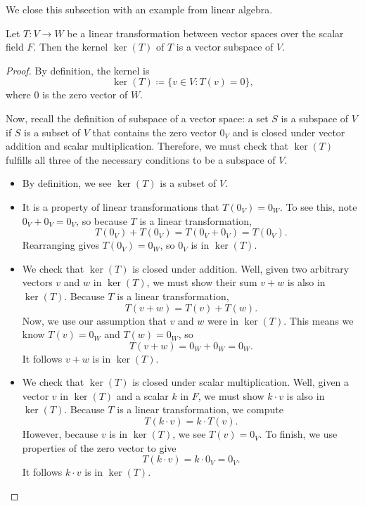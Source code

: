 \documentclass[../notes.tex]{subfiles}
\begin{document}
We close this subsection with an example from linear algebra.
\begin{example} %
    Let $T\colon V \to W$ be a linear transformation between vector spaces over the scalar field $F$. Then the kernel $\ker(T)$ of $T$ is a vector subspace of $V$.
\end{example}
\begin{proof}
    By definition, the kernel is
    \[\ker(T) \coloneqq \{v \in V: T(v) = 0\},\]
    where $0$ is the zero vector of $W$.
    
    Now, recall the definition of subspace of a vector space: a set $S$ is a subspace of $V$ if $S$ is a subset of $V$ that contains the zero vector $0_V$ and is closed under vector addition and scalar multiplication. Therefore, we must check that $\ker(T)$ fulfills all three of the necessary conditions to be a subspace of $V$.
    \begin{itemize}
        \item By definition, we see $\ker(T)$ is a subset of $V$.
        \item It is a property of linear transformations that $T(0_V)=0_W$. To see this, note $0_V+0_V=0_V$, so because $T$ is a linear transformation,
        \[T(0_V)+T(0_V)=T(0_V+0_V)=T(0_V).\]
        Rearranging gives $T(0_V)=0_W$, so $0_V$ is in $\ker(T)$.
        \item We check that $\ker(T)$ is closed under addition. Well, given two arbitrary vectors $v$ and $w$ in $\ker(T)$, we must show their sum $v+w$ is also in $\ker(T)$. Because $T$ is a linear transformation,
        \[T(v+w)=T(v)+T(w).\]
        Now, we use our assumption that $v$ and $w$ were in $\ker(T)$. This means we know $T(v) = 0_W$ and $T(w) = 0_W$, so
        \[T(v+w)=0_W+0_W=0_W.\]
        It follows $v+w$ is in $\ker(T)$.
        \item We check that $\ker(T)$ is closed under scalar multiplication. Well, given a vector $v$ in $\ker(T)$ and a scalar $k$ in $F$, we must show $k\cdot v$ is also in $\ker(T)$. Because $T$ is a linear transformation, we compute
        \[T(k\cdot v)=k\cdot T(v).\]
        However, because $v$ is in $\ker(T)$, we see $T(v)=0_V$. To finish, we use properties of the zero vector to give
        \[T(k\cdot v)=k\cdot 0_V=0_V.\]
        It follows $k\cdot v$ is in $\ker(T)$.
        \qedhere
    \end{itemize}
\end{proof}
\end{document}
